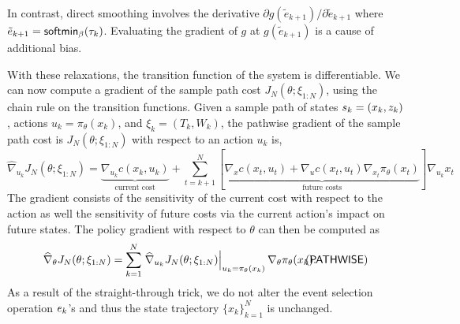 In contrast, direct smoothing involves the derivative $\partial g(\tilde{e}_{k+1})/\partial \tilde{e}_{k+1}$ where $\tilde{e}_{k+1} = \mathsf{softmin}_{\beta}(\tau_{k})$.  Evaluating the gradient of $g$ at $g(\tilde{e}_{k+1})$ is a cause of additional bias.

With these relaxations, the transition function of the system is differentiable. We can now compute a gradient of the sample path cost $J_{N}(\theta; \xi_{1:N})$, using the chain rule on the transition functions. Given a sample path of states $s_{k} = (x_{k}, z_{k})$, actions $u_{k} = \pi_{\theta}(x_{k})$, and $\xi_{k} = (T_{k}, W_{k})$, the pathwise gradient of the sample path cost is $J_{N}(\theta; \xi_{1:N})$ with respect to an action $u_{k}$ is,
\[
\widehat{\nabla}_{u_{k}} J_{N}(\theta; \xi_{1:N})
= \underbrace{\nabla_{u_{k}}c(x_{k},u_{k})}_{\text{current cost}} + \sum_{t=k+1}^{N} 
\left[  \underbrace{ \nabla_{x}c(x_{t}, u_t) + \nabla_{u} c(x_{t}, u_t)\nabla_{x_{t}}\pi_{\theta}(x_{t})}_{\text{future costs}} \right]
\nabla_{u_{k}}x_{t}
\]
The gradient consists of the sensitivity of the current cost with respect to the action as well the sensitivity of future costs via the current action's impact on future states. The policy gradient with respect to $\theta$ can then be computed as
\begin{equation}
\label{eq:pathwise-pg}
\widehat{\nabla}_{\theta} J_{N}(\theta; \xi_{1:N}) = \sum_{k=1}^{N} \left. \widehat{\nabla}_{u_{k}} J_{N}(\theta; \xi_{1:N}) \right|_{u_{k} = \pi_{\theta}(x_{k})} \nabla_{\theta} \pi_{\theta}(x_{k}).
\hspace{-3em}
\tag{$\pathwise$}
\end{equation}
As a result of the straight-through trick, we do not alter the event selection operation $e_{k}$'s and thus the state trajectory $\{x_{k} \}_{k=1}^{N}$ is unchanged.

